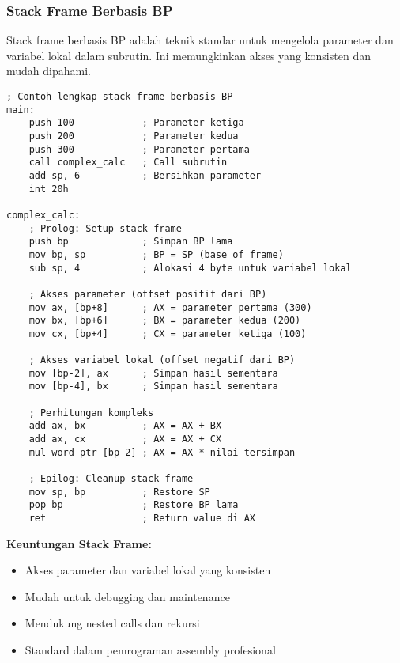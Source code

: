 \documentclass[../main.tex]{subfiles}
\begin{document}
            \subsubsection{Stack Frame Berbasis BP}
                Stack frame berbasis BP adalah teknik standar untuk mengelola parameter dan variabel lokal dalam subrutin. Ini memungkinkan akses yang konsisten dan mudah dipahami.

                \begin{lstlisting}[language={[x86masm]Assembler}, caption=Stack Frame Berbasis BP, label={lst:stack-frame-bp}]
; Contoh lengkap stack frame berbasis BP
main:
    push 100            ; Parameter ketiga
    push 200            ; Parameter kedua
    push 300            ; Parameter pertama
    call complex_calc   ; Call subrutin
    add sp, 6           ; Bersihkan parameter
    int 20h

complex_calc:
    ; Prolog: Setup stack frame
    push bp             ; Simpan BP lama
    mov bp, sp          ; BP = SP (base of frame)
    sub sp, 4           ; Alokasi 4 byte untuk variabel lokal
    
    ; Akses parameter (offset positif dari BP)
    mov ax, [bp+8]      ; AX = parameter pertama (300)
    mov bx, [bp+6]      ; BX = parameter kedua (200)
    mov cx, [bp+4]      ; CX = parameter ketiga (100)
    
    ; Akses variabel lokal (offset negatif dari BP)
    mov [bp-2], ax      ; Simpan hasil sementara
    mov [bp-4], bx      ; Simpan hasil sementara
    
    ; Perhitungan kompleks
    add ax, bx          ; AX = AX + BX
    add ax, cx          ; AX = AX + CX
    mul word ptr [bp-2] ; AX = AX * nilai tersimpan
    
    ; Epilog: Cleanup stack frame
    mov sp, bp          ; Restore SP
    pop bp              ; Restore BP lama
    ret                 ; Return value di AX
                \end{lstlisting}

                \textbf{Keuntungan Stack Frame:}
                \begin{itemize}
                    \item Akses parameter dan variabel lokal yang konsisten
                    \item Mudah untuk debugging dan maintenance
                    \item Mendukung nested calls dan rekursi
                    \item Standard dalam pemrograman assembly profesional
                \end{itemize}
\end{document}

